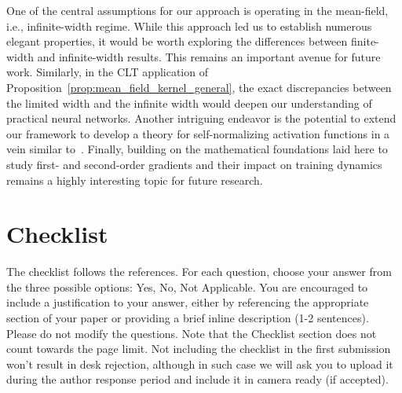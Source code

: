 \documentclass[twoside]{article}
\theoremstyle{definition}
\begin{document}
One of the central assumptions for our approach is operating in the mean-field, i.e., infinite-width regime. While this approach led us to establish numerous elegant properties, it would be worth exploring the differences between finite-width and infinite-width results. This remains an important avenue for future work. Similarly, in the CLT application of Proposition~\ref{prop:mean_field_kernel_general}, the exact discrepancies between the limited width and the infinite width would deepen our understanding of practical neural networks. Another intriguing endeavor is the potential to extend our framework to develop a theory for self-normalizing activation functions in a vein similar to~\citep{klambauer2017self}. Finally, building on the mathematical foundations laid here to study first- and second-order gradients and their impact on training dynamics remains a highly interesting topic for future research. 




% 



\onecolumn

\section*{Checklist}


The checklist follows the references. For each question, choose your answer from the three possible options: Yes, No, Not Applicable. You are encouraged to include a justification to your answer, either by referencing the appropriate section of your paper or providing a brief inline description (1-2 sentences). 
Please do not modify the questions. Note that the Checklist section does not count towards the page limit. Not including the checklist in the first submission won't result in desk rejection, although in such case we will ask you to upload it during the author response period and include it in camera ready (if accepted).
\end{document}
